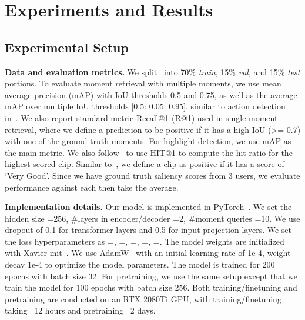 \section{Experiments and Results}

\subsection{Experimental Setup}\label{sec:experiment_setup}
\textbf{Data and evaluation metrics.}
We split \DatasetName~into 70\% \textit{train}, 15\% \textit{val}, and 15\% \textit{test} portions.
To evaluate moment retrieval with multiple moments, we use mean average precision (mAP) with IoU thresholds 0.5 and 0.75, as well as the average mAP over multiple IoU thresholds [0.5: 0.05: 0.95], similar to action detection in~\cite{caba2015activitynet}.
We also report standard metric Recall@1 (R@1) used in single moment retrieval, where we define a prediction to be positive if it has a high IoU (>= 0.7) with one of the ground truth moments. 
For highlight detection, we use mAP as the main metric. 
We also follow~\cite{liu2015multi} to use HIT@1 to compute the hit ratio for the highest scored clip.
Similar to~\cite{liu2015multi}, we define a clip as positive if it has a score of `Very Good'.
Since we have ground truth saliency scores from 3 users, we evaluate performance against each then take the average. 

\textbf{Implementation details.}
Our model is implemented in PyTorch~\cite{paszke2019pytorch}. We set the hidden size =256, \#layers in encoder/decoder =2, \#moment queries =10.
We use dropout of 0.1 for transformer layers and 0.5 for input projection layers.
We set the loss hyperparameters as =, =, =, =, =. 
The model weights are initialized with Xavier init~\cite{glorot2010understanding}.
We use AdamW~\cite{loshchilov2017decoupled} with an initial learning rate of 1e-4, weight decay 1e-4 to optimize the model parameters.
The model is trained for 200 epochs with batch size 32.
For pretraining, we use the same setup except that we train the model for 100 epochs with batch size 256. 
Both training/finetuning and pretraining are conducted on an RTX 2080Ti GPU, with training/finetuning taking ~12 hours and pretraining ~2 days.



